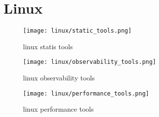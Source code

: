 \chapter{Linux}
\label{chap:linux}


\begin{figure}[H]
    \centering
    \texttt{[image: linux/static\_tools.png]}
    \caption{linux statis tools}
\end{figure}



\begin{figure}[H]
    \centering
    \texttt{[image: linux/observability\_tools.png]}
    \caption{linux observability tools}
\end{figure}


\begin{figure}[H]
    \centering
    \texttt{[image: linux/performance\_tools.png]}
    \caption{linux performance tools}
\end{figure}